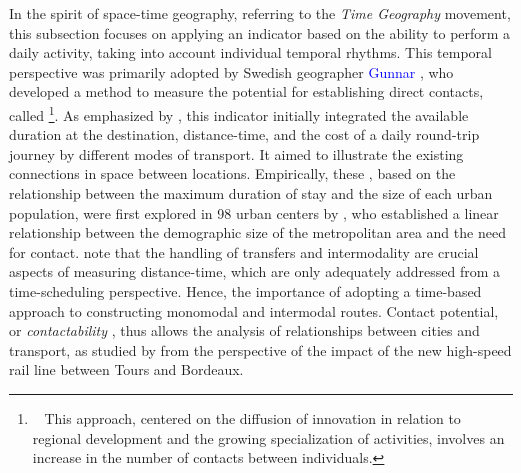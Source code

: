 \begin{refsegment}
In the spirit of space-time geography, referring to the \textsl{Time Geography} movement, this subsection focuses on applying an indicator based on the ability to perform a daily activity, taking into account individual temporal rhythms. This temporal perspective was primarily adopted by Swedish geographer \textcolor{blue}{Gunnar} \textcolor{blue}{\textcite{tornqvist_contact_1984}}, who developed a method to measure the potential for establishing direct contacts, called \footnote{~
    This approach, centered on the diffusion of innovation in relation to regional development and the growing specialization of activities, involves an increase in the number of contacts between individuals.
}. As emphasized by \textcolor{blue}{\textcite[9-11]{lhostis_contribution_2018}}, this indicator initially integrated the available duration at the destination, distance-time, and the cost of a daily round-trip journey by different modes of transport. It aimed to illustrate the existing connections in space between locations. Empirically, these , based on the relationship between the maximum duration of stay and the size of each urban population, were first explored in 98 urban centers by \textcolor{blue}{\textcite[13, 18]{tornqvist_contact_1984}}, who established a linear relationship between the demographic size of the metropolitan area and the need for contact. \textcolor{blue}{\textcite[12]{lhostis_contribution_2018}} note that the handling of transfers and intermodality are crucial aspects of measuring distance-time, which are only adequately addressed from a time-scheduling perspective. Hence, the importance of adopting a time-based approach to constructing monomodal and intermodal routes. Contact potential, or \textsl{contactability} \textcolor{blue}{\autocite[]{haggett_geography_2001}}, thus allows the analysis of relationships between cities and transport, as studied by \textcolor{blue}{\textcite[6]{lhostis_using_2017}} from the perspective of the impact of the new high-speed rail line between Tours and Bordeaux.%


\end{refsegment}
